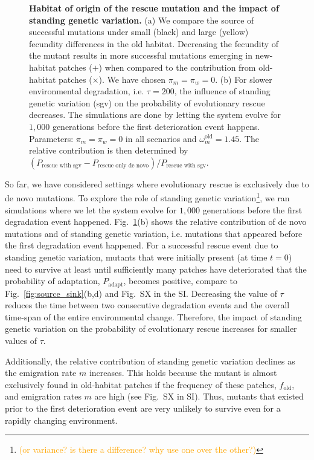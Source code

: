 \documentclass[a4paper,11pt]{article}
\newcommand{\pete}[1]{\textcolor{orange}{(#1)}}
\newcommand{\chg}[1]{\textcolor{change}{#1}}
\begin{document}
\begin{figure}[t]
	\caption{\textbf{Habitat of origin of the rescue mutation and the impact of standing genetic variation.} \small (a) We compare the source of successful mutations under small (black) and large (yellow) fecundity differences in the old habitat. Decreasing the fecundity of the mutant results in more successful mutations emerging in new-habitat patches ($+$) when compared to the contribution from old-habitat patches ($\times$). We have chosen $\pi_m=\pi_w=0$. (b) For slower environmental degradation, i.e. $\tau=200$, the influence of standing genetic variation (sgv) on the probability of evolutionary rescue decreases. The simulations are done by letting the system evolve for $1,000$ generations before the first deterioration event happens. Parameters: $\pi_m=\pi_w=0$ in all scenarios and $\omega^\text{old}_m=1.45$. The relative contribution is then determined by $(P_{\text{rescue with sgv}}-P_{\text{rescue only de novo}})/P_{\text{rescue with sgv}}$.}
	\label{fig:sgv}
\end{figure}

So far, we have considered settings where evolutionary rescue is exclusively due to de novo mutations. To explore the role of standing genetic variation\footnote{\pete{or variance? is there a difference? why use one over the other?}}, we ran simulations where we let the system evolve for $1,000$ generations before the first degradation event happened. Fig.~\ref{fig:sgv}(b) shows the relative contribution of de novo mutations and of standing genetic variation, i.e. mutations that appeared before the first degradation event happened. \chg{For a successful rescue event due to standing genetic variation, mutants that were initially present (at time $t=0$) need to survive at least until sufficiently many patches have deteriorated that the probability of adaptation, $P_{\text{adapt}}$, becomes positive, compare to Fig.~\ref{fig:source_sink}(b,d) and Fig.~SX in the SI.} \chg{Decreasing the value of $\tau$ reduces the time between two consecutive degradation events and the overall time-span of the entire environmental change. Therefore, the impact of standing genetic variation on the probability of evolutionary rescue increases for smaller values of $\tau$.}

Additionally, the relative contribution of standing genetic variation declines as the emigration rate $m$ increases. 
This holds because \chg{the mutant is almost exclusively found in old-habitat patches if the frequency of these patches, $f_{\text{old}}$, and emigration rates $m$ are high} (see Fig.~SX in SI). Thus, mutants that existed prior to the first deterioration event are very unlikely to survive even for a rapidly changing environment. 
\end{document}
